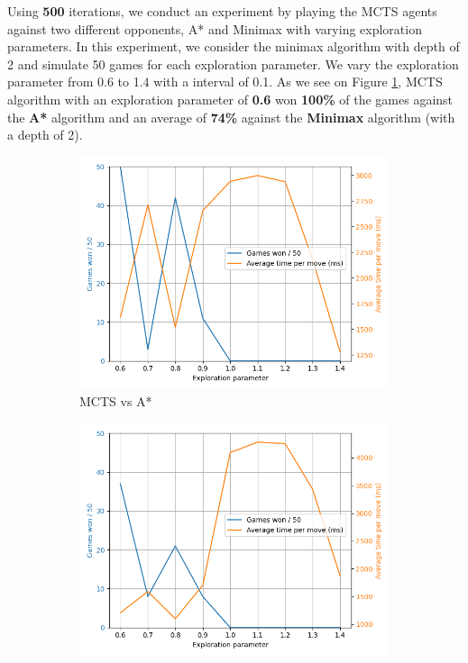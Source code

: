 Using \textbf{500} iterations, we conduct an experiment by playing the MCTS agents against two different opponents, A* and Minimax with varying exploration parameters. In this experiment, we consider the minimax algorithm with depth of 2 and simulate 50 games for each exploration parameter. We vary the exploration parameter from 0.6 to 1.4 with a interval of 0.1. As we see on Figure \ref{fig:3x3MCTSTuningAStar}, MCTS algorithm with an exploration parameter of \textbf{0.6} won \textbf{100\%} of the games against the \textbf{A*} algorithm and an average of \textbf{74\%} against the \textbf{Minimax} algorithm (with a depth of 2).

\begin{figure}[!ht]
    \begin{subfigure}{0.5\textwidth}
      \includegraphics[width=\textwidth]{../img/mcts_exploration_param_grid_search_3_astar.png}
      \caption{MCTS vs A*}
      \label{fig:3x3MCTSTuningAStar}
    \end{subfigure}
    \hfill
    \begin{subfigure}{0.5\textwidth}
      \includegraphics[width=\textwidth]{../img/mcts_exploration_param_grid_search_3_minimax.png}

\end{subfigure}
\end{figure}
